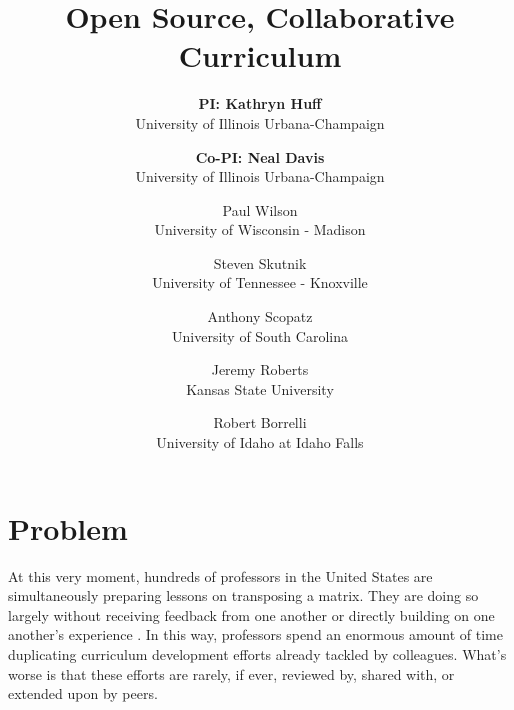 \documentclass[11pt]{article}
\makeatletter
\newcommand{\authorname}{Kathryn~D.~Huff }
\newcommand{\authoremail}{kdhuff@illinois.edu}
\newcommand{\authorsite}{arfc.npre.illinois.edu}
\makeatother
\begin{document}
          \title{Open Source, Collaborative Curriculum}
          \author{\textbf{PI: Kathryn Huff}\\%
                  University of Illinois Urbana-Champaign
                  \and
\textbf{Co-PI: Neal Davis}\\University of Illinois Urbana-Champaign
\and
Paul Wilson\\University of Wisconsin - Madison 
\and
          Steven Skutnik\\University of Tennessee - Knoxville
\and
          Anthony Scopatz\\University of South Carolina 
\and
          Jeremy Roberts\\Kansas State University 
\and
          Robert Borrelli\\University of Idaho at Idaho Falls
}
          \maketitle

          \pagestyle{fancy}
          \lhead{\textcolor{gray}{PI: \authorname (NPRE)\\\authoremail}}
          \rhead{\textcolor{gray}{Collaborative Open Source Curriculum Development\\}}
          \renewcommand{\headrulewidth}{0pt}
          \renewcommand{\footrulewidth}{0pt}

          \section{Problem}
          At this very moment, hundreds of professors in the United States are 
          simultaneously preparing lessons on transposing a matrix.
          They are doing so largely without receiving feedback from one another 
          or directly building on one another's experience 
          \cite{green_building_2014}. In this way, 
          professors spend an enormous amount of time duplicating curriculum 
          development efforts already tackled by colleagues. What's worse is 
          that these efforts are rarely, if ever, reviewed by, shared with, or 
          extended upon by peers.
          
\end{document}

